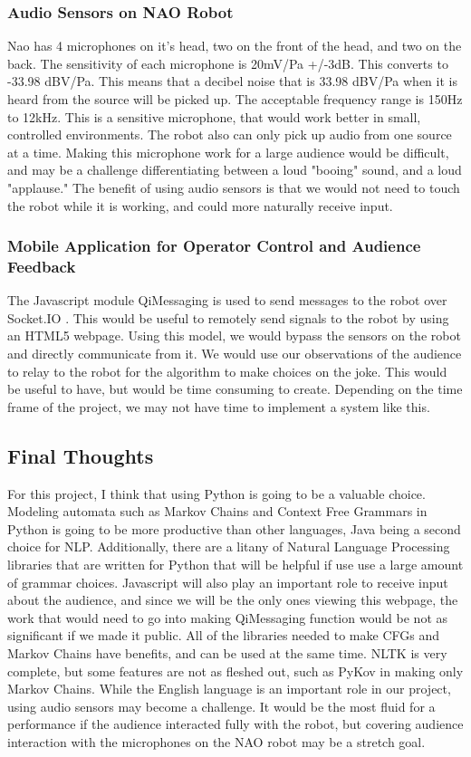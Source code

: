   \subsubsection{Audio Sensors on NAO Robot}
    Nao has 4 microphones on it's head, two on the front of the head, and two on the back. The sensitivity of each microphone is 20mV/Pa +/-3dB. This converts to -33.98 dBV/Pa. This means that a decibel noise that is 33.98 dBV/Pa when it is heard from the source will be picked up. The acceptable frequency range is 150Hz to 12kHz. This is a sensitive microphone, that would work better in small, controlled environments. The robot also can only pick up audio from one source at a time. Making this microphone work for a large audience would be difficult, and may be a challenge differentiating between a loud "booing" sound, and a loud "applause." The benefit of using audio sensors is that we would not need to touch the robot while it is working, and could more naturally receive input.
  \subsubsection{Mobile Application for Operator Control and Audience Feedback}

  The Javascript module QiMessaging \cite{qimessagingjavascript} is used to send messages to the robot over Socket.IO \cite{socketIO}. This would be useful to remotely send signals to the robot by using an HTML5 webpage. Using this model, we would bypass the sensors on the robot and directly communicate from it. We would use our observations of the audience to relay to the robot for the algorithm to make choices on the joke. This would be useful to have, but would be time consuming to create. Depending on the time frame of the project, we may not have time to implement a system like this.


\subsection{Final Thoughts}

  For this project, I think that using Python is going to be a valuable choice. Modeling automata such as Markov Chains and Context Free Grammars in Python is going to be more productive than other languages, Java being a second choice for NLP. Additionally, there are a litany of Natural Language Processing libraries that are written for Python that will be helpful if use use a large amount of grammar choices. Javascript will also play an important role to receive input about the audience, and since we will be the only ones viewing this webpage, the work that would need to go into making QiMessaging function would be not as significant if we made it public. All of the libraries needed to make CFGs and Markov Chains have benefits, and can be used at the same time. NLTK is very complete, but some features are not as fleshed out, such as PyKov in making only Markov Chains. While the English language is an important role in our project, using audio sensors may become a challenge. It would be the most fluid for a performance if the audience interacted fully with the robot, but covering audience interaction with the microphones on the NAO robot may be a stretch goal.
\pagebreak

